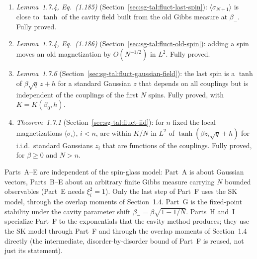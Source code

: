 \begin{enumerate}
\item[J.] \emph{Lemma~1.7.4, Eq.~(1.185)} (Section~\ref{sec:sg-tal:fluct-last-spin}): $\langle\sigma_{N+1}\rangle$ is close to $\tanh$ of the cavity field built from the old Gibbs measure at $\beta_-$.  Fully proved.
\item[K.] \emph{Lemma~1.7.4, Eq.~(1.186)} (Section~\ref{sec:sg-tal:fluct-old-spin}): adding a spin moves an old magnetization by $O(N^{-1/2})$ in $L^2$.  Fully proved.
\item[L.] \emph{Lemma~1.7.6} (Section~\ref{sec:sg-tal:fluct-gaussian-field}): the last spin is a $\tanh$ of $\beta\sqrt q\,z+h$ for a standard Gaussian $z$ that depends on all couplings but is independent of the couplings of the first $N$ spins.  Fully proved, with $K=K(\beta_0,h)$.
\item[M.] \emph{Theorem~1.7.1} (Section~\ref{sec:sg-tal:fluct-iid}): for $n$ fixed the local magnetizations $\langle\sigma_i\rangle$, $i<n$, are within $K/N$ in $L^2$ of $\tanh(\beta z_i\sqrt q+h)$ for i.i.d.\ standard Gaussians $z_i$ that are functions of the couplings.  Fully proved, for $\beta\ge0$ and $N>n$.
\end{enumerate}
Parts~A--E are independent of the spin-glass model: Part~A is about Gaussian vectors, Parts~B--E about an arbitrary finite
Gibbs measure carrying $N$ bounded observables (Part~E needs $\xi_i^2=1$).  Only the last step of Part~F uses the SK model, through the overlap moments of Section~1.4.  Part~G is the fixed-point stability under the cavity parameter shift $\beta_-=\beta\sqrt{1-1/N}$.  Parts~H and~I specialize Part~F to the exponentials that the cavity method produces; they use the SK model through Part~F and through the overlap moments of Section~1.4 directly (the intermediate, disorder-by-disorder bound of Part~F is reused, not just its statement).

